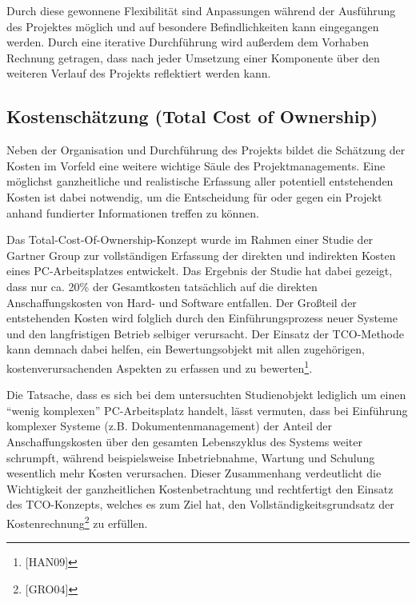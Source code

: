 \documentclass[a4paper]{article}
\begin{document}
\bigskip

{\sffamily
Durch diese gewonnene Flexibilität sind Anpassungen während der Ausführung des Projektes möglich und auf besondere
Befindlichkeiten kann eingegangen werden. Durch eine iterative Durchführung wird außerdem dem Vorhaben Rechnung
getragen, dass nach jeder Umsetzung einer Komponente über den weiteren Verlauf des Projekts reflektiert werden kann.}

\subsection{Kostenschätzung (Total Cost of Ownership)}
\label{bkm:RefHeading24769162299686}{\sffamily
Neben der Organisation und Durchführung des Projekts bildet die Schätzung der Kosten im Vorfeld eine weitere wichtige
Säule des Projektmanagements. Eine möglichst ganzheitliche und realistische Erfassung aller potentiell entstehenden
Kosten ist dabei notwendig, um die Entscheidung für oder gegen ein Projekt anhand fundierter Informationen treffen zu
können.}


\bigskip

{\sffamily
Das Total-Cost-Of-Ownership-Konzept wurde im Rahmen einer Studie der Gartner Group zur vollständigen Erfassung der
direkten und indirekten Kosten\textbf{ }eines PC-Arbeitsplatzes entwickelt. Das Ergebnis der Studie hat dabei gezeigt,
dass nur ca. 20\% der Gesamtkosten tatsächlich auf die direkten Anschaffungskosten von Hard- und Software entfallen.
Der Großteil der entstehenden Kosten wird folglich durch den Einführungsprozess neuer Systeme und den langfristigen
Betrieb selbiger verursacht. Der Einsatz der TCO-Methode kann demnach dabei helfen, ein Bewertungsobjekt mit allen
zugehörigen, kostenverursachenden Aspekten zu erfassen und zu bewerten\footnote{[HAN09]}.}


\bigskip

{\sffamily
Die Tatsache, dass es sich bei dem untersuchten Studienobjekt lediglich um einen “wenig komplexen” PC-Arbeitsplatz
handelt, lässt vermuten, dass bei Einführung komplexer Systeme (z.B. Dokumentenmanagement) der Anteil der
Anschaffungskosten über den gesamten Lebenszyklus des Systems weiter schrumpft, während beispielsweise Inbetriebnahme,
Wartung und Schulung wesentlich mehr Kosten verursachen. Dieser Zusammenhang verdeutlicht die Wichtigkeit der
ganzheitlichen Kostenbetrachtung und rechtfertigt den Einsatz des TCO-Konzepts, welches es zum Ziel hat, den
Vollständigkeitsgrundsatz der Kostenrechnung\footnote{[GRO04]}\textcolor{red}{ }zu erfüllen.}
\end{document}
